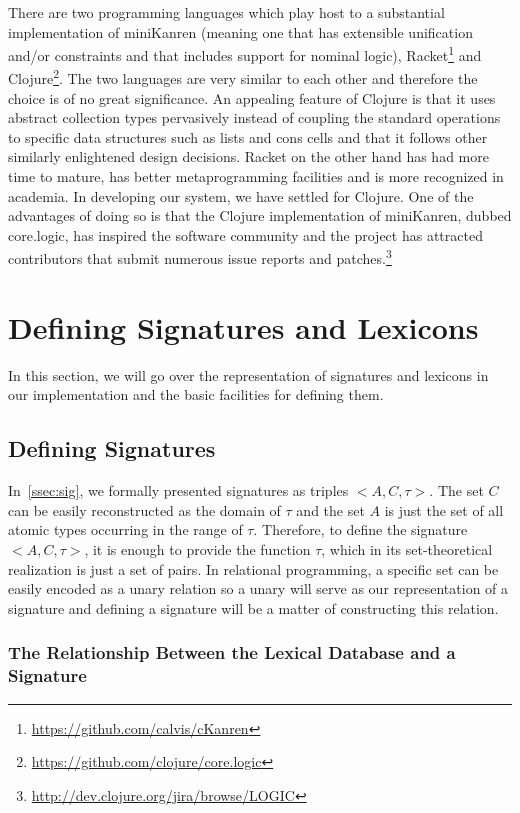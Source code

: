 There are two programming languages which play host to a substantial
implementation of miniKanren (meaning one that has extensible
unification and/or constraints and that includes support for nominal
logic), Racket\footnote{\url{https://github.com/calvis/cKanren}} and
Clojure\footnote{\url{https://github.com/clojure/core.logic}}. The two
languages are very similar to each other and therefore the choice is of
no great significance. An appealing feature of Clojure is that it uses
abstract collection types pervasively instead of coupling the standard
operations to specific data structures such as lists and cons cells and
that it follows other similarly enlightened design decisions. Racket on
the other hand has had more time to mature, has better metaprogramming
facilities and is more recognized in academia. In developing our system,
we have settled for Clojure. One of the advantages of doing so is that
the Clojure implementation of miniKanren, dubbed core.logic, has
inspired the software community and the project has attracted
contributors that submit numerous issue reports and
patches.\footnote{\url{http://dev.clojure.org/jira/browse/LOGIC}}


\section{Defining Signatures and Lexicons}

In this section, we will go over the representation of signatures and
lexicons in our implementation and the basic facilities for defining
them.

\subsection{Defining Signatures}
\label{ssec:def-sig}

In~\ref{ssec:sig}, we formally presented signatures as triples
$\mathopen{<}A, C, \tau\mathclose{>}$. The set $C$ can be easily
reconstructed as the domain of $\tau$ and the set $A$ is just the set of
all atomic types occurring in the range of $\tau$. Therefore, to define
the signature $\mathopen{<}A, C, \tau\mathclose{>}$, it is enough to
provide the function $\tau$, which in its set-theoretical realization is
just a set of pairs. In relational programming, a specific set can be
easily encoded as a unary relation so a unary will serve as our
representation of a signature and defining a signature will be a matter
of constructing this relation.

\subsubsection{The Relationship Between the Lexical Database and a Signature}

